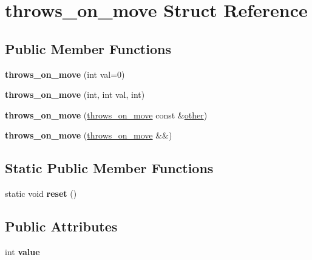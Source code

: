 \hypertarget{structthrows__on__move}{}\section{throws\+\_\+on\+\_\+move Struct Reference}
\label{structthrows__on__move}
\subsection*{Public Member Functions}
\begin{DoxyCompactItemize}
\item 
\mbox{\label{structthrows__on__move_a8177417a1968ac966068a2ce78e4b626}} 
{\bfseries throws\+\_\+on\+\_\+move} (int val=0)
\item 
\mbox{\label{structthrows__on__move_a41fbcb5cddfd410f0e10e1bd695ad87d}} 
{\bfseries throws\+\_\+on\+\_\+move} (int, int val, int)
\item 
\mbox{\label{structthrows__on__move_ab68218225201f6bb57bf85abf6ce8638}} 
{\bfseries throws\+\_\+on\+\_\+move} (\mbox{\hyperlink{structthrows__on__move}{throws\+\_\+on\+\_\+move}} const \&\mbox{\hyperlink{structother}{other}})
\item 
\mbox{\label{structthrows__on__move_afd201336878520d1fc3c6370300dc3d3}} 
{\bfseries throws\+\_\+on\+\_\+move} (\mbox{\hyperlink{structthrows__on__move}{throws\+\_\+on\+\_\+move}} \&\&)
\end{DoxyCompactItemize}
\subsection*{Static Public Member Functions}
\begin{DoxyCompactItemize}
\item 
\mbox{\label{structthrows__on__move_aa66f6d7cee9937f787b10d4f5a949ddf}} 
static void {\bfseries reset} ()
\end{DoxyCompactItemize}
\subsection*{Public Attributes}
\begin{DoxyCompactItemize}
\item 
\mbox{\label{structthrows__on__move_ac75c6647323d39fb28860906f14a6ed5}} 
int {\bfseries value}
\end{DoxyCompactItemize}
